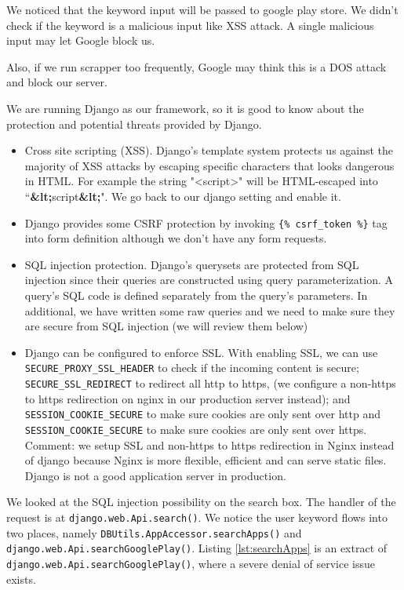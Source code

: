 \documentclass[12pt, a4paper]{article}
\newcommand{\code}[1]{\texttt{#1}}
\begin{document}


We noticed that the keyword input will be passed to google play store. We didn't check if the keyword is a malicious input like XSS attack. A single malicious input may let Google block us.

Also, if we run scrapper too frequently, Google may think this is a DOS attack and block our server. 



We are running Django as our framework, so it is good to know about the protection and potential threats provided by Django.
\begin{itemize}
    \item Cross site scripting (XSS). Django's template system protects us against the majority of XSS attacks by escaping specific characters that looks dangerous in HTML. For example the string "<script>" will be HTML-escaped into ``\textbf{\&lt;}script\textbf{\&lt;}". We go back to our django setting and enable it.
    \item Django provides some CSRF protection by invoking \code{\{\% csrf\_token \%\}} tag into form definition although we don't have any form requests.
    \item SQL injection protection. Django’s querysets are protected from SQL injection since their queries are constructed using query parameterization. A query’s SQL code is defined separately from the query’s parameters. In additional, we have written some raw queries and we need to make sure they are secure from SQL injection (we will review them below)
    \item Django can be configured to enforce SSL. With enabling SSL, we can use \code{SECURE\_PROXY\_SSL\_HEADER} to check if the incoming content is secure; \code{SECURE\_SSL\_REDIRECT} to redirect all http to https, (we configure a non-https to https redirection on nginx in our production server instead); and \code{SESSION\_COOKIE\_SECURE} to make sure cookies are only sent over http and \code{SESSION\_COOKIE\_SECURE} to make sure cookies are only sent over https. Comment: we setup SSL and non-https to https redirection in Nginx instead of django because Nginx is more flexible, efficient and can serve static files. Django is not a good application server in production.
\end{itemize}


We looked at the SQL injection possibility on the search box. The handler of the request is at \code{django.web.Api.search()}. We notice the user keyword flows into two places, namely \code{DBUtils.AppAccessor.\linebreak[0]searchApps()} and \code{django.web.Api.searchGooglePlay()}. Listing \ref{lst:searchApps} is an extract of \code{django.web.Api.searchGooglePlay()}, where a severe denial of service issue exists.
\end{document}
